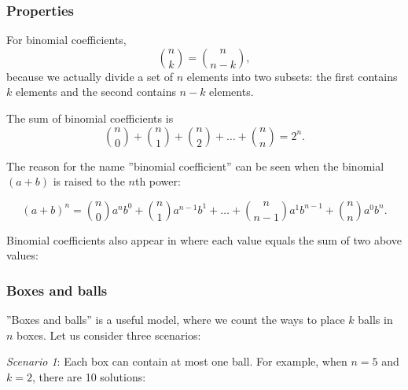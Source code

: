 \subsubsection{Properties}

For binomial coefficients,
\[
{n \choose k}  =  {n \choose n-k},
\]
because we actually divide a set of $n$ elements into
two subsets: the first contains $k$ elements
and the second contains $n-k$ elements.

The sum of binomial coefficients is
\[
{n \choose 0}+{n \choose 1}+{n \choose 2}+\ldots+{n \choose n}=2^n.
\]

The reason for the name ''binomial coefficient''
can be seen when the binomial $(a+b)$ is raised to
the $n$th power:

\[ (a+b)^n =
{n \choose 0} a^n b^0 + 
{n \choose 1} a^{n-1} b^1 +
\ldots + 
{n \choose n-1} a^1 b^{n-1} +
{n \choose n} a^0 b^n. \]


Binomial coefficients also appear in
where each value equals the sum of two
above values:
\begin{center}
\end{center}

\subsubsection{Boxes and balls}

''Boxes and balls'' is a useful model,
where we count the ways to
place $k$ balls in $n$ boxes.
Let us consider three scenarios:

\textit{Scenario 1}: Each box can contain
at most one ball.
For example, when $n=5$ and $k=2$,
there are 10 solutions:

